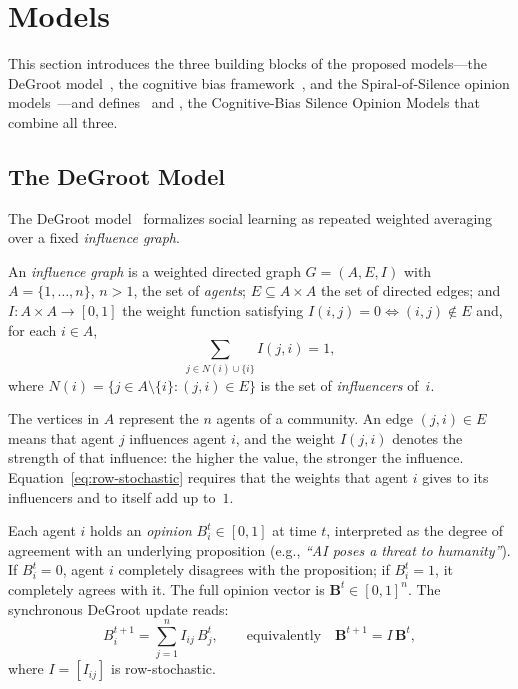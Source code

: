 \section{Models}
\label{sec:model}

This section introduces the three building blocks of the proposed
models---the DeGroot model~\cite{DeGroot1974}, the cognitive bias
framework~\cite{Alvim2024}, and the Spiral-of-Silence opinion
models~\cite{aranda2024sound}---and defines
\CBSOMminus\ and \CBSOMplus, the Cognitive-Bias Silence Opinion
Models that combine all three.

\subsection{The DeGroot Model}
\label{sec:degroot}

The DeGroot model~\cite{DeGroot1974} formalizes social learning as
repeated weighted averaging over a fixed \emph{influence graph}.

\begin{definition}\label{def:influence-graph}
  An \emph{influence graph} is a weighted directed graph $G=(A,E,I)$
  with $A=\{1,\ldots,n\}$, $n>1$, the set of \emph{agents};
  $E\subseteq A\times A$ the set of directed edges; and
  $I:A\times A\to[0,1]$ the weight function satisfying
  $I(i,j)=0\iff(i,j)\notin E$ and, for each $i\in A$,
  \begin{equation}\label{eq:row-stochastic}
    \sum_{j\in N(i)\cup\{i\}}I(j,i)=1,
  \end{equation}
  where $N(i)=\{j\in A\setminus\{i\}:(j,i)\in E\}$ is the set of
  \emph{influencers} of~$i$.
\end{definition}

The vertices in $A$ represent the $n$ agents of a community. An edge
$(j,i)\in E$ means that agent $j$ influences agent $i$, and the weight
$I(j,i)$ denotes the strength of that influence: the higher the value,
the stronger the influence. Equation~\eqref{eq:row-stochastic} requires
that the weights that agent $i$ gives to its influencers and to itself
add up to~$1$.

Each agent $i$ holds an \emph{opinion} $B_i^t\in[0,1]$ at time $t$,
interpreted as the degree of agreement with an underlying proposition
(e.g., \emph{``AI poses a threat to humanity''}). If $B_i^t=0$, agent $i$
completely disagrees with the proposition; if $B_i^t=1$, it completely
agrees with it. The full opinion vector is $\mathbf{B}^t\in[0,1]^n$.
The synchronous DeGroot update reads:
\begin{equation}\label{eq:degroot}
  B_i^{t+1} = \sum_{j=1}^n I_{ij}\,B_j^t,
  \qquad\text{equivalently}\quad
  \mathbf{B}^{t+1}=I\,\mathbf{B}^t,
\end{equation}
where $I=[I_{ij}]$ is row-stochastic.

